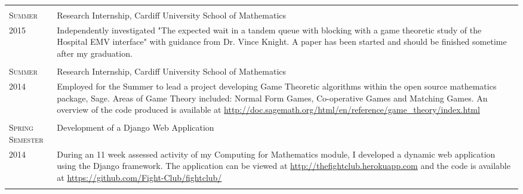 \documentclass[a4paper]{article}
\begin{document}
\begin{tabularx}{\textwidth}{lX}
\\
\\
\textsc{Summer} & Research Internship, Cardiff University School of Mathematics \\
\textsc{2015} & \footnotesize{Independently investigated "The expected wait in a tandem queue with blocking with a game theoretic study of the Hospital EMV interface" with guidance from Dr. Vince Knight. A paper has been started and should be finished sometime after my graduation.}
\\
\\
\textsc{Summer} & Research Internship, Cardiff University School of Mathematics \\
\textsc{2014} & \footnotesize{Employed for the Summer to lead a project developing Game Theoretic algorithms within the open source mathematics package, Sage.
Areas of Game Theory included: Normal Form Games, Co-operative Games and Matching Games. An overview of the code produced is available at \url{http://doc.sagemath.org/html/en/reference/game_theory/index.html}}
\\
\\
\textsc{Spring Semester} & Development of a Django Web Application\\
\textsc{2014} & \footnotesize{During an 11 week assessed activity of my Computing for Mathematics module, I developed a dynamic web application using the Django framework. The application can be viewed at \url{http://thefightclub.herokuapp.com} and the code is available at \url{https://github.com/Fight-Club/fightclub/}}
\\
\\
\end{tabularx}

\end{document}
